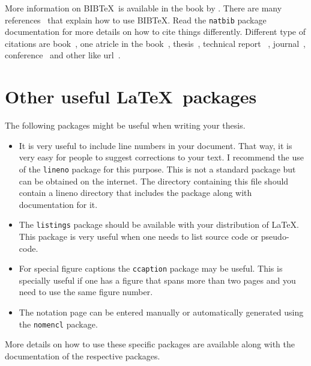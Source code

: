\documentclass[BTech]{iitmdiss}
\begin{document}
 More information on BIB\TeX\ is available in the book by
 \cite{lamport}.  There are many
 references~\citep{lamport, helmut, david} that explain how to use
 BIB\TeX.  Read the \verb+natbib+ package documentation for more
 details on how to cite things differently. Different type of citations are 
book~\cite{bellman}, one atricle in the book~\cite{Amarel:1968}, thesis~\cite{manning}, technical report
~\cite{Ravindran:proof}, journal~\cite{Barto:rtdp}, conference~\cite{knoblock90learning} and other like url~\cite{crawford92theoretical}.
 
 \section{Other useful \LaTeX\ packages}
 
 The following packages might be useful when writing your thesis.
 
 \begin{itemize}  
 \item It is very useful to include line numbers in your document.
   That way, it is very easy for people to suggest corrections to your
   text.  I recommend the use of the \texttt{lineno} package for this
   purpose.  This is not a standard package but can be obtained on the
   internet.  The directory containing this file should contain a
   lineno directory that includes the package along with documentation
   for it.
 
 \item The \texttt{listings} package should be available with your
   distribution of \LaTeX.  This package is very useful when one needs
   to list source code or pseudo-code.
 
 \item For special figure captions the \texttt{ccaption} package may be
   useful.  This is specially useful if one has a figure that spans
   more than two pages and you need to use the same figure number.
 
 \item The notation page can be entered manually or automatically
   generated using the \texttt{nomencl} package.
 
 \end{itemize}
 
 More details on how to use these specific packages are available along
 with the documentation of the respective packages.

\end{document}
